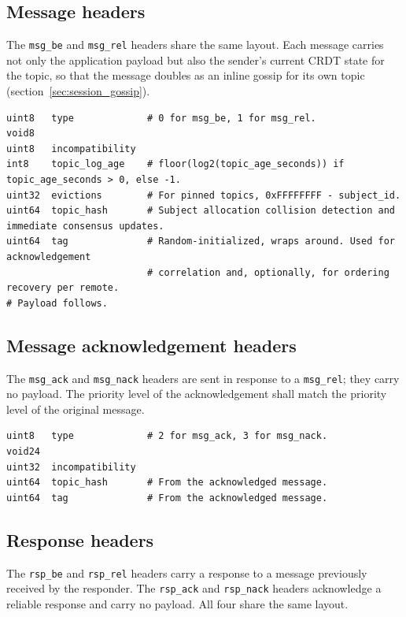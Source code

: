\subsection{Message headers}\label{sec:session_header_msg}

The \texttt{msg\_be} and \texttt{msg\_rel} headers share the same layout. Each
message carries not only the application payload but also the sender's
current CRDT state for the topic, so that the message doubles as an inline
gossip for its own topic (section~\ref{sec:session_gossip}).

\begin{verbatim}
uint8   type             # 0 for msg_be, 1 for msg_rel.
void8
uint8   incompatibility
int8    topic_log_age    # floor(log2(topic_age_seconds)) if topic_age_seconds > 0, else -1.
uint32  evictions        # For pinned topics, 0xFFFFFFFF - subject_id.
uint64  topic_hash       # Subject allocation collision detection and immediate consensus updates.
uint64  tag              # Random-initialized, wraps around. Used for acknowledgement
                         # correlation and, optionally, for ordering recovery per remote.
# Payload follows.
\end{verbatim}

\subsection{Message acknowledgement headers}\label{sec:session_header_msg_ack}

The \texttt{msg\_ack} and \texttt{msg\_nack} headers are sent in response to a
\texttt{msg\_rel}; they carry no payload. The priority level of the
acknowledgement shall match the priority level of the original message.

\begin{verbatim}
uint8   type             # 2 for msg_ack, 3 for msg_nack.
void24
uint32  incompatibility
uint64  topic_hash       # From the acknowledged message.
uint64  tag              # From the acknowledged message.
\end{verbatim}

\subsection{Response headers}\label{sec:session_header_rsp}

The \texttt{rsp\_be} and \texttt{rsp\_rel} headers carry a response to a
message previously received by the responder. The \texttt{rsp\_ack} and
\texttt{rsp\_nack} headers acknowledge a reliable response and carry no
payload. All four share the same layout.

